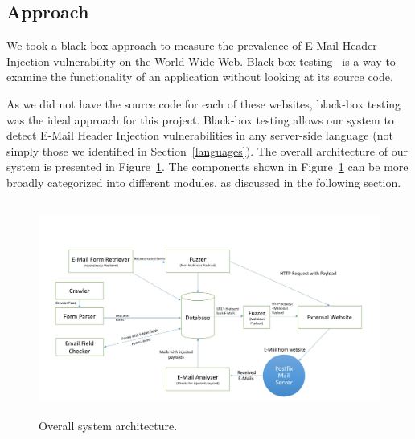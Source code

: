\subsection{Approach}
\label{sys:appr}
We took a black-box approach to measure the prevalence of E-Mail Header Injection vulnerability on the World Wide Web. Black-box testing~\cite{Beizer:1995:BTT:202699} is a way to examine the functionality of an application without looking at its source code.

As we did not have the source code for each of these websites, black-box testing was the ideal approach for this project. Black-box testing allows our system to detect E-Mail Header Injection vulnerabilities in any server-side language (not simply those we identified in Section~\ref{languages}). The overall architecture of our system is presented in Figure~\ref{fig:overall}. The components shown in Figure~\ref{fig:overall} can be more broadly categorized into different modules, as discussed in the following section.

\begin{figure}
	\centering
	\includegraphics[width=14cm, height=7cm]{overall}
	\caption{Overall system architecture.}
	\label{fig:overall}
\end{figure}
